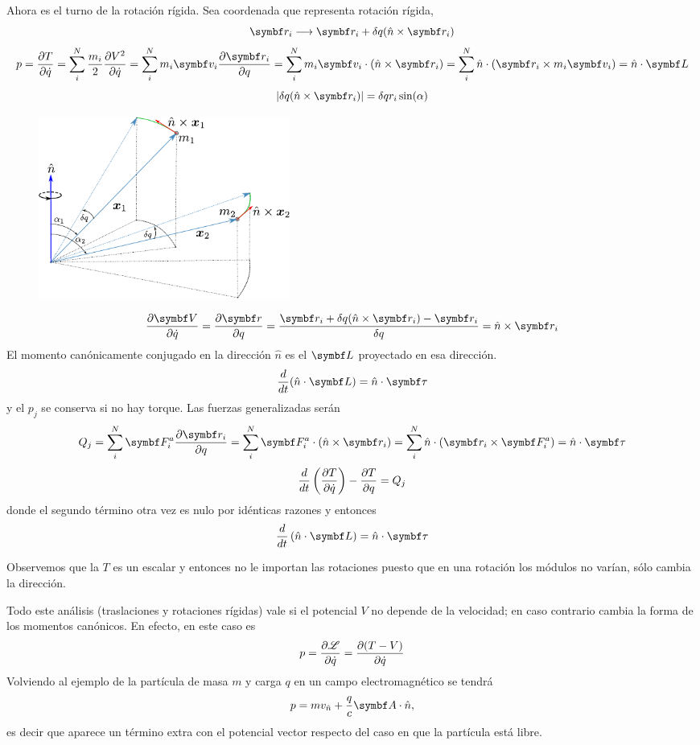 \documentclass[10pt,oneside]{CBFT_book}
\begin{document}
Ahora es el turno de la rotación rígida. Sea coordenada que representa rotación rígida,
\[
	\vb{r}_i \longrightarrow \vb{r}_i + \delta q (\hat{n} \times \vb{r}_i)
\]
\[
	p = \dpar{T}{\dot{q}} = \sum_i^N \frac{m_i}{2}\dpar{V^2}{\dot{q}} = \sum_i^N m_i \vb{v}_i \dpar{\vb{r}_i}{q}
	= \sum_i^N m_i \vb{v}_i \cdot ( \hat{n} \times \vb{r}_i ) = \sum_i^N \hat{n} \cdot ( \vb{r}_i \times m_i 
	\vb{v}_i) = \hat{n} \cdot \vb{L}
\]
\[
	|\delta q(\hat{n} \times \vb{r}_i)| = \delta q r_i \sin (\alpha)
\]
\begin{figure}[htb]
	\begin{center}
	\includegraphics[width=0.4\textwidth]{images/fig_mc_rot_rig.pdf}	 
	\end{center}
	\caption{}
\end{figure} 
\[
	\dpar{\vb{V}}{\dot{q}} = \dpar{\vb{r}}{q} = \frac{ \vb{r}_i +\delta q (\hat{n} \times \vb{r}_i)- 
	\vb{r}_i}{\delta q} = \hat{n} \times \vb{r}_i 
\]
El momento canónicamente conjugado en la dirección $\hat{n}$ es el $\vb{L}$ proyectado en esa dirección.
\[
	\frac{d}{dt}(\hat{n}\cdot\vb{L}) = \hat{n}\cdot\vb{\tau}
\]
y el $p_j$ se conserva si no hay torque.
Las fuerzas generalizadas serán
\[
	Q_j = \sum_i^N \vb{F}^a_i \dpar{\vb{r}_i}{q} = \sum_i^N \vb{F}^a_i \cdot ( \hat{n} \times \vb{r}_i ) = 
	\sum_i^N \hat{n}  \cdot ( \vb{r}_i \times  \vb{F}^a_i) = \hat{n}\cdot\vb{\tau}
\]
\[
	\frac{d}{dt}\left( \frac{\partial^{\hspace{-0.05em}} {T}}{\partial {\dot{q}}^{\hspace{-0.05em}}} \right) - \frac{\partial^{\hspace{-0.05em}} {T}}{\partial {q}^{\hspace{-0.05em}}} = Q_j
\]
donde el segundo término otra vez es nulo por idénticas razones y entonces
\[
	\frac{d}{dt}\left( \hat{n}\cdot \vb{L} \right) = \hat{n}\cdot \vb{\tau}
\]

Observemos que la $T$ es un escalar y entonces no le importan las rotaciones puesto
que en una rotación los módulos no varían, sólo cambia la dirección.


Todo este análisis (traslaciones y rotaciones rígidas) vale si el potencial $V$ no depende de la
velocidad; en caso contrario cambia la forma de los momentos canónicos. En efecto, en este caso
es
\[
	p = \frac{\partial^{\hspace{-0.05em}} { \mathscr{L} }}{\partial {\dot{q}}^{\hspace{-0.05em}}} = \frac{\partial^{\hspace{-0.05em}} {(T-V)}}{\partial {\dot{q}}^{\hspace{-0.05em}}}
\]
Volviendo al ejemplo de la partícula de masa $m$ y carga $q$ en un campo electromagnético se tendrá
\[
	p = m v_{\hat{n}} + \frac{q}{c} \vb{A}\cdot\hat{n},
\]
es decir que aparece un término extra con el potencial vector respecto del caso en que la partícula
está libre.
\end{document}
